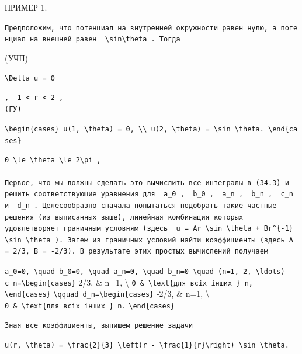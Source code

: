 \documentclass[
  ukrainian,
]{article}
\begin{document}
ПРИМЕР 1.

\texttt{Предположим,\ что\ потенциал\ на\ внутренней\ окружности\ равен\ нулю,\ а\ потенциал\ на\ внешней\ равен\ \ \textquotesingle{}\textbackslash{}sin\textbackslash{}theta\textquotesingle{}\ .\ Тогда}

(УЧП)

\begin{verbatim}
\Delta u = 0
\end{verbatim}

\begin{verbatim}
,  1 < r < 2 ,  
(ГУ)
\end{verbatim}

\texttt{\textbackslash{}begin\{cases\}\ u(1,\ \textbackslash{}theta)\ =\ 0,\ \textbackslash{}\textbackslash{}\ u(2,\ \textbackslash{}theta)\ =\ \textbackslash{}sin\ \textbackslash{}theta.\ \textbackslash{}end\{cases\}}

\begin{verbatim}
0 \le \theta \le 2\pi ,

Первое, что мы должны сделать—это вычислить все интегралы в (34.3) и решить соответствующие уравнения для  a_0 ,  b_0 ,  a_n ,  b_n ,  c_n  и  d_n . Целесообразно сначала попытаться подобрать такие частные решения (из выписанных выше), линейная комбинация которых удовлетворяет граничным условням (здесь  u = Ar \sin \theta + Br^{-1} \sin \theta ). Затем из граничных условий найти коэффициенты (здесь A = 2/3, B = -2/3). В результате этих простых вычислений получаем
\end{verbatim}

\texttt{a\_0=0,\ \textbackslash{}quad\ b\_0=0,\ \textbackslash{}quad\ a\_n=0,\ \textbackslash{}quad\ b\_n=0\ \textbackslash{}quad\ (n=1,\ 2,\ \textbackslash{}ldots)}
\texttt{c\_n=\textbackslash{}begin\{cases\}} 2/3, \& n=1,
\textbackslash{}
\texttt{0\ \&\ \textbackslash{}text\{для\ всіх\ інших\ \}\ n,}
\texttt{\textbackslash{}end\{cases\}}
\texttt{\textbackslash{}qquad\ d\_n=\textbackslash{}begin\{cases\}}
-2/3, \& n=1, \textbackslash{}
\texttt{0\ \&\ \textbackslash{}text\{для\ всіх\ інших\ \}\ n.}
\texttt{\textbackslash{}end\{cases\}}

\begin{verbatim}
Зная все коэффициенты, выпишем решение задачи
\end{verbatim}

\texttt{u(r,\ \textbackslash{}theta)\ =\ \textbackslash{}frac\{2\}\{3\}\ \textbackslash{}left(r\ -\ \textbackslash{}frac\{1\}\{r\}\textbackslash{}right)\ \textbackslash{}sin\ \textbackslash{}theta.}
\end{document}
